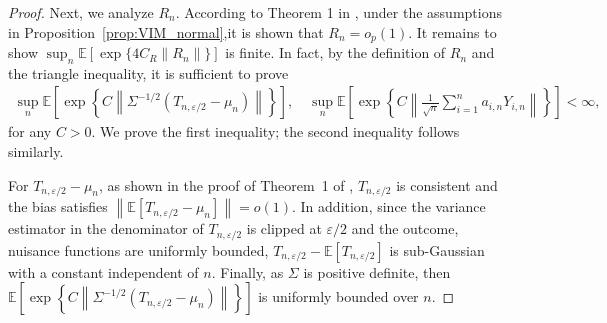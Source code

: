 \documentclass[12pt]{article}
\newcommand{\op}{\mathrm{op}}
\newcommand{\rbracket}[1]{\left[ #1 \right]}
\newtheorem{proposition}{Proposition}[section]
\newcommand{\real}{\mathbb{R}}
\newcommand{\Ee}{{\mathbb{E}}}
\newcommand{\cP}{{\mathcal{P}}}
\begin{document}
\begin{appendices}
\begin{proof}
Next, we analyze $R_n$. According to Theorem 1 in \cite{williamson2023general}, under the assumptions in Proposition~\ref{prop:VIM_normal},it is shown that $R_n = o_p(1)$.
It remains to show $\sup_n \Ee\left[\exp\{4C_R\|R_n\|\}\right]$ is finite.
In fact, by the definition of $R_n$ and the triangle inequality, it is sufficient to prove
\begin{align*}
    \sup_n
    \Ee\left[
        \exp\left\{
           C\left\|\Sigma^{-1/2}(T_{n,\varepsilon/2}-\mu_n)\right\|
        \right\}
    \right], \quad 
    \sup_n
    \Ee\left[
        \exp\left\{
            C\left\|
            \frac{1}{\sqrt n}\sum_{i=1}^n a_{i,n}Y_{i,n}
            \right\|
        \right\}
    \right]
    <\infty,
\end{align*}
for any $C > 0$. 
We prove the first inequality; the second inequality follows similarly. 

For $T_{n,\varepsilon/2}-\mu_n$, as shown in the proof of Theorem~1 of \citet{williamson2023general}, $T_{n,\varepsilon/2}$ is consistent and the bias satisfies $\left\|\Ee[T_{n,\varepsilon/2}-\mu_n]\right\|=o(1)$.
In addition, since the variance estimator in the denominator of $T_{n,\varepsilon/2}$ is clipped at $\varepsilon/2$ and the outcome, nuisance functions are uniformly bounded,
$T_{n,\varepsilon/2}-\Ee[T_{n,\varepsilon/2}]$ is sub-Gaussian with a constant independent of $n$. 
Finally, as $\Sigma$ is positive definite, then $\Ee\left[ \exp\left\{C\left\|\Sigma^{-1/2}(T_{n,\varepsilon/2}-\mu_n) \right\| \right\} \right]$ is uniformly bounded over $n$.

\end{proof}





\end{appendices}
\end{document}
